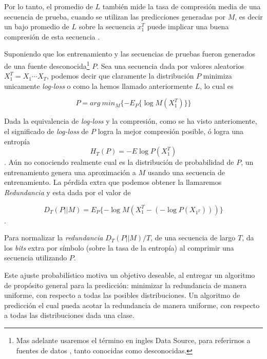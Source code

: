 Por lo tanto, el promedio de $L$ también mide la tasa de compresión media de una secuencia de prueba, cuando se utilizan las predicciones generadas por $M$, es decir un bajo promedio de $L$%
sobre la secuencia $x_{1}^{T}$ puede implicar una buena compresión de esta secuencia \cite{Begleiter2004}.

Suponiendo que los entrenamiento y las secuencias de pruebas fueron generados de una fuente desconocida\footnote{Mas adelante usaremos el término en ingles Data Source, para referirnos a fuentes de datos , tanto conocidas como desconocidas.} $P$. Sea una secuencia dada por valores aleatorios $X_{1}^{T} = X_{1} \cdots X_{T} $, podemos decir que claramente la distribución $P$ minimiza unicamente \emph{log-loss} o como la hemos llamado anteriormente $L$, lo cual es

\begin{equation}
P = arg\ min_{M} \{ - E_{P} \{\log M( X_{1}^{T} )\}   \}
\end{equation}


Dada la equivalencia de \emph{log-loss} y la compresión, como se ha visto anteriomente, el significado de \emph{log-loss} de $P$ logra la mejor compresión posible, ó logra una entropía 
\begin{equation}
	H_{T}(P) = - E \log P( X_{1}^{T} )
\end{equation}. Aún no conociendo realmente cual es la distribución de probabilidad de $P$, un entrenamiento genera una aproximación a $M$ usando una secuencia de entrenamiento. La pérdida extra que podemos obtener la llamaremos \emph{Redundancia} y esta dada por el valor de

\begin{equation}
D_{T} ( P || M ) = E_{P} \{ - \log M(X_{1}^{T} - (- \log P(X_{1^{T}})   )  )       \} 
\end{equation}.
 

Para normalizar la \emph{redundancia} $D_{T} ( P || M ) / T $, de una secuencia de largo $T$, da los  \emph{bits} extra por símbolo (sobre la tasa de la entropía) al comprimir una secuencia utilizando $P$.  

Este ajuste probabilístico motiva un objetivo deseable, al entregar un algoritmo de propósito general para la predicción: minimizar la redundancia de manera uniforme, con respecto a todas las posibles distribuciones. Un algoritmo de predicción el cual pueda acotar la redundancia de manera uniforme, con respecto a todas las distribuciones dada una clase.

